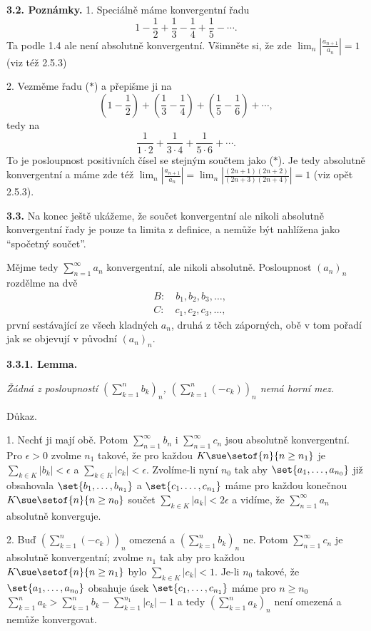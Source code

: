 \documentclass[12pt]{article}
\begin{document}
{ \bigskip
 
 {\bf 3.2. Poznámky.} 1. Speciálně máme konvergentní řadu
 \begin{equation}
 1-\frac12+\frac13-\frac14+\frac15-\cdots.
 \tag{$*$}
 \end{equation}
 Ta podle 1.4 ale není absolutně konvergentní. Všimněte si, že zde $\lim_n\left|\frac{a_{n+1}}{a_n}\right|=1$ (viz též 2.5.3)
 
 \smallskip
 
 2. Vezměme řadu ($*$) a přepišme ji na
 $$ \left(1-\frac12\right)+\left(\frac13-\frac14\right)+\left(\frac15-\frac16\right)+\cdots,
 $$
 tedy na
 $$
 \frac1{1\cdot 2}+\frac1{3\cdot 4}+\frac1{5\cdot 6}+\cdots .
 $$
 To je posloupnost positivních čísel se stejným součtem jako ($*$). Je tedy absolutně konvergentní a máme zde též $\lim_n\left|\frac{a_{n+1}}{a_n}\right|=\lim_n\left|\frac{(2n+1)(2n+2)}{(2n+3)(2n+4)}\right|=1$ (viz opět 2.5.3).
 
 \bigskip
 
 {\bf 3.3.} Na konec ještě ukážeme, že součet konvergentní ale nikoli absolutně konvergentní řady je pouze ta limita
z definice, a nemůže být nahlížena jako
 ``spočetný součet''.
 
  Mějme tedy $\sum_{n=1}^\infty a_n$ konvergentní, ale nikoli absolutně.  Posloupnost $(a_n)_n$ rozdělme na dvě
 $$
 \begin{aligned}
 &B:\quad b_1,b_2,b_3,\dots,\\
 &C:\quad c_1,c_2,c_3,\dots,
 \end{aligned}
 $$
 první sestávající ze všech kladných $a_n$, druhá z těch záporných, obě v tom pořadí jak se objevují v původní $(a_n)_n$.
 
 \medskip
 
 {\bf 3.3.1. Lemma.} {\em Žádná z posloupností $(\sum_{k=1}^nb_k)_n$,
 $(\sum_{k=1}^n(-c_k))_n$ nemá horní mez.
 
 Důkaz.} 1. Nechť ji mají obě. Potom $\sum_{n=1}^\infty b_n$ i 
 $\sum_{n=1}^\infty c_n$ jsou absolutně konvergentní. Pro $\epsilon>0$ zvolme $n_1$
takové, že pro každou $K\sue \setof{n}{n\geq n_1}$ je $\sum_{k\in K}|b_k|<\epsilon$ a $\sum_{k\in K}|c_k|<\epsilon$. Zvolíme-li nyní $n_0$ tak aby $\set{a_1,\dots,a_{n_0}}$ již obsahovala $\set{b_1,\dots,b_{n_1}}$ a $\set{c_1.\dots,c_{n_1}}$ máme pro každou konečnou $K\sue \setof{n}{n\geq n_0}$ součet $\sum_{k\in K}|a_k|<2\epsilon$ a vidíme, že $\sum_{n=1}^\infty a_n$ absolutně konverguje.
 
 \smallskip
 
 2. Buď $(\sum_{k=1}^n(-c_k))_n$ omezená a $(\sum_{k=1}^nb_k)_n$ ne. Potom $\sum_{n=1}^\infty c_n$ je absolutně konvergentní; zvolme $n_1$
tak aby pro každou  $K\sue \setof{n}{n\geq n_1}$ bylo $\sum_{k\in K}|c_k|<1$. Je-li $n_0$ takové, že $\set{a_1,\dots,a_{n_0}}$ obsahuje úsek $\set{c_1,\dots,c_{n_1}}$ máme pro $n\geq n_0$  $\sum_{k=1}^na_k>
 \sum_{k=1}^nb_k -\sum_{k=1}^{n_1}|c_k| -1$ a tedy $(\sum_{k=1}^na_k)_n$ není omezená a nemůže konvergovat. \sq
 
}
\end{document}
